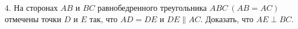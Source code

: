 4. На сторонах $AB$ и $BC$ равнобедренного треугольника $ABC\ (AB=AC)$ отмечены точки $D$ и $E$ так, что $AD=DE$ и $DE\parallel AC.$ Доказать, что $AE\perp BC.$\\
